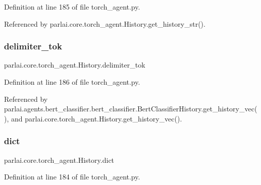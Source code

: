 Definition at line 185 of file torch\+\_\+agent.\+py.



Referenced by parlai.\+core.\+torch\+\_\+agent.\+History.\+get\+\_\+history\+\_\+str().

\mbox{\label{classparlai_1_1core_1_1torch__agent_1_1History_a3120b2e6c188316aeffdf1bafbd5baa6}} 
\subsubsection{\texorpdfstring{delimiter\+\_\+tok}{delimiter\_tok}}
{\footnotesize\ttfamily parlai.\+core.\+torch\+\_\+agent.\+History.\+delimiter\+\_\+tok}



Definition at line 186 of file torch\+\_\+agent.\+py.



Referenced by parlai.\+agents.\+bert\+\_\+classifier.\+bert\+\_\+classifier.\+Bert\+Classifier\+History.\+get\+\_\+history\+\_\+vec(), and parlai.\+core.\+torch\+\_\+agent.\+History.\+get\+\_\+history\+\_\+vec().

\mbox{\label{classparlai_1_1core_1_1torch__agent_1_1History_af2dcae73b57a3718cdcb558377a3526b}} 
\subsubsection{\texorpdfstring{dict}{dict}}
{\footnotesize\ttfamily parlai.\+core.\+torch\+\_\+agent.\+History.\+dict}



Definition at line 184 of file torch\+\_\+agent.\+py.



